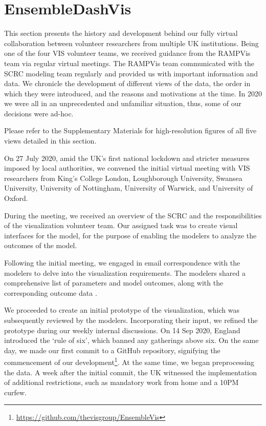 \section{EnsembleDashVis}
\label{sec:EnsembleDashVis}

This section presents the history and development behind our fully virtual collaboration between volunteer researchers from multiple UK institutions.
Being one of the four VIS volunteer teams, we received guidance from the RAMPVis team via regular virtual meetings. The RAMPVis team communicated with the SCRC modeling team regularly and provided us with important information and data.
We chronicle the development of different views of the data, the order in which they were introduced, and the reasons and motivations at the time.
In 2020 we were all in an unprecedented and unfamiliar situation, thus, some of our decisions were ad-hoc.

Please refer to the Supplementary Materials for high-resolution figures of all five views detailed in this section.


\label{subsec:InitialMeeting}
On 27 July 2020, amid the UK's first national lockdown and stricter measures imposed by local authorities, we convened the initial virtual meeting with VIS researchers from King's College London, Loughborough University, Swansea University, University of Nottingham, University of Warwick, and University of Oxford.

During the meeting, we received an overview of the SCRC and the responsibilities of the visualization volunteer team.
Our assigned task was to create visual interfaces for the model, for the purpose of enabling the modelers to analyze the outcomes of the model.

Following the initial meeting, we engaged in email correspondence with the modelers to delve into the visualization requirements. The modelers shared a comprehensive list of parameters and model outcomes, along with the corresponding outcome data \cite{scrc2020Covid19}.


We proceeded to create an initial prototype of the visualization, which was subsequently reviewed by the modelers.
Incorporating their input, we refined the prototype during our weekly internal discussions.
On 14 Sep 2020, England introduced the `rule of six', which banned any gatherings above six.
On the same day, we made our first commit to a GitHub repository, signifying the commencement of our development\footnote{\url{https://github.com/thevisgroup/EnsembleVis}}.
At the same time, we began preprocessing the data.
A week after the initial commit, the UK witnessed the implementation of additional restrictions, such as mandatory work from home and a 10PM curfew.

